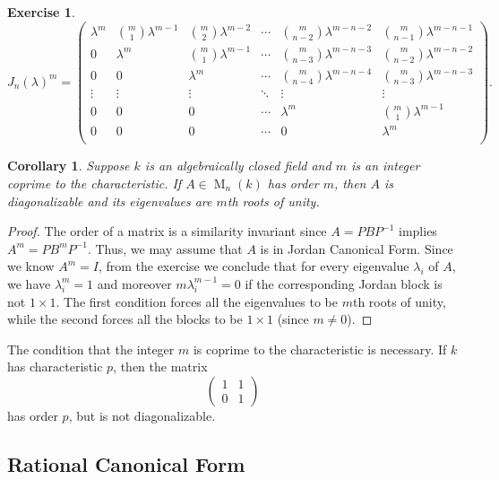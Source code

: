 \documentclass[12pt]{article}
\theoremstyle{plain}
\newtheorem{corollary}[theorem]{Corollary}
\newtheorem{exercise}[theorem]{Exercise}
\theoremstyle{definition}
\theoremstyle{remark}
\numberwithin{equation}{section}
\begin{document}
\begin{exercise}
\[J_n(\lambda)^m =
\begin{pmatrix}
\lambda^m & \binom{m}{1}\lambda^{m-1} & \binom{m}{2}\lambda^{m-2}
& \cdots & \binom{m}{n-2}\lambda^{m-n-2} & \binom{m}{n-1}\lambda^{m-n-1}\\
0 & \lambda^m & \binom{m}{1}\lambda^{m-1}
& \cdots & \binom{m}{n-3}\lambda^{m-n-3} & \binom{m}{n-2}\lambda^{m-n-2}\\
0 & 0 & \lambda^m & \cdots &
\binom{m}{n-4}\lambda^{m-n-4} & \binom{m}{n-3}\lambda^{m-n-3}\\
\vdots & \vdots & \vdots & \ddots & \vdots & \vdots \\
0 & 0 & 0 & \cdots & \lambda^m & \binom{m}{1}\lambda^{m-1}\\
0 & 0 & 0 & \cdots & 0 & \lambda^m\\
 \end{pmatrix} .\]
\end{exercise}

\begin{corollary}
Suppose $k$ is an algebraically closed field
and $m$ is an integer coprime to the characteristic.
If $A \in \operatorname{M}_n(k)$ has order $m$,
then $A$ is diagonalizable and its eigenvalues are $m$th roots of unity.
\end{corollary}

\begin{proof}
The order of a matrix is a similarity invariant since
$A=PBP^{-1}$ implies $A^m=PB^mP^{-1}$.
Thus, we may assume that $A$ is in Jordan Canonical Form.
Since we know $A^m=I$, from the exercise we conclude that
for every eigenvalue $\lambda_i$ of $A$, we have
$\lambda_i^m = 1$
and moreover $m\lambda_i^{m-1}=0$ if the corresponding Jordan block is
not $1\times 1$.
The first condition forces all the eigenvalues to be $m$th roots of
unity, while the second forces all the blocks to be $1 \times 1$
(since $m\ne 0$).
\end{proof}

The condition that the integer $m$ is coprime to the characteristic is
necessary.  If $k$ has characteristic $p$, then the matrix
\[
\begin{pmatrix} 1 & 1 \\ 0 & 1 \end{pmatrix} 
\]
has order $p$, but is not diagonalizable. 

\subsection{Rational Canonical Form}
\end{document}
